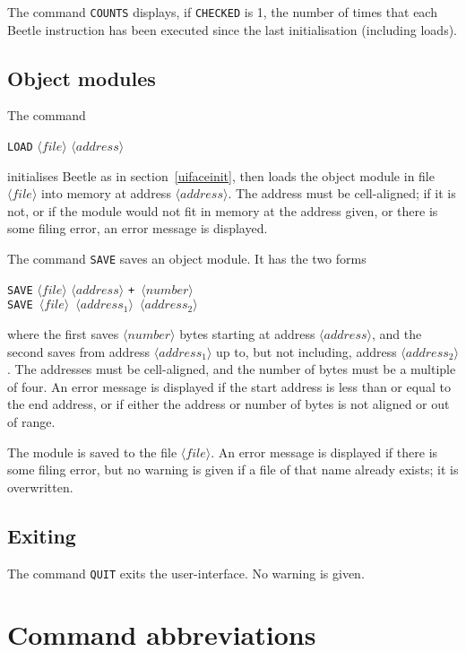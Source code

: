 \documentclass{article}
\newcommand{\angb}[1]{$\langle #1\rangle$}
\begin{document}
The command {\tt COUNTS} displays, if {\tt CHECKED} is 1, the number of times
that each Beetle instruction has been executed since the last initialisation
(including loads).

\subsection{Object modules}

The command

\label{uifaceload}
\begin{center}{\tt LOAD} \angb{file} \angb{address}\end{center}

initialises Beetle as in section~\ref{uifaceinit}, then loads the object
module in file \angb{file} into memory at address \angb{address}. The address
must be cell-aligned; if it is not, or if the module would not fit in memory
at the address given, or there is some filing error, an error message is
displayed.

The command {\tt SAVE} saves an object module. It has the two forms

\begin{center}
{\tt SAVE} \angb{file} \angb{address} \tt{+} \angb{number}\\
{\tt SAVE} \angb{file} \angb{address_1} \angb{address_2}
\end{center}

where the first saves \angb{number} bytes starting at address \angb{address},
and the second saves from address \angb{address_1} up to, but not including,
address \angb{address_2}. The addresses must be cell-aligned, and the number
of bytes must be a multiple of four. An error message is displayed if the
start address is less than or equal to the end address, or if either the
address or number of bytes is not aligned or out of range.

The module is saved to the file \angb{file}. An error message is displayed if
there is some filing error, but no warning is given if a file of that name
already exists; it is overwritten.

\subsection{Exiting}

The command {\tt QUIT} exits the user-interface. No warning is given.


\section{Command abbreviations} \label{abbrev}
\end{document}
